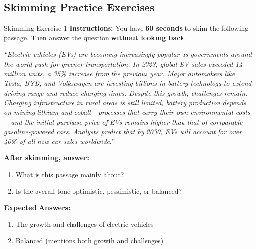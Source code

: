\documentclass[12pt,a4paper]{article}
\begin{document}
\subsection{Skimming Practice Exercises}

\begin{practicebox}{Skimming Exercise 1}
\textbf{Instructions:} You have \textbf{60 seconds} to skim the following passage. Then answer the question \textbf{without looking back}.

\textit{``Electric vehicles (EVs) are becoming increasingly popular as governments around the world push for greener transportation. In 2023, global EV sales exceeded 14 million units, a 35\% increase from the previous year. Major automakers like Tesla, BYD, and Volkswagen are investing billions in battery technology to extend driving range and reduce charging times. Despite this growth, challenges remain. Charging infrastructure in rural areas is still limited, battery production depends on mining lithium and cobalt---processes that carry their own environmental costs---and the initial purchase price of EVs remains higher than that of comparable gasoline-powered cars. Analysts predict that by 2030, EVs will account for over 40\% of all new car sales worldwide.''}

\textbf{After skimming, answer:}
\begin{enumerate}[noitemsep]
    \item What is this passage mainly about?
    \item Is the overall tone optimistic, pessimistic, or balanced?
\end{enumerate}
\textbf{Expected Answers:}
\begin{enumerate}[noitemsep]
    \item The growth and challenges of electric vehicles
    \item Balanced (mentions both growth and challenges)
\end{enumerate}
\end{practicebox}
\end{document}
